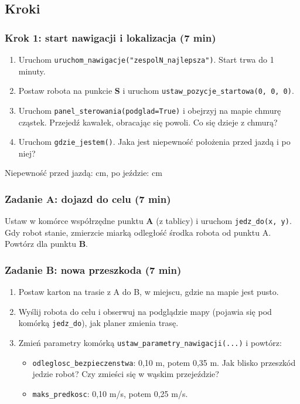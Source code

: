 \subsection{Kroki}\label{kroki}

\subsubsection{Krok 1: start nawigacji i lokalizacja (7 min)}\label{krok-1-start-nawigacji-i-lokalizacja-7-min}

\begin{enumerate}
\def\labelenumi{\arabic{enumi}.}
\tightlist
\item
  Uruchom \texttt{uruchom\_nawigacje("zespolN\_najlepsza")}. Start trwa do 1 minuty.
\item
  Postaw robota na punkcie \textbf{S} i uruchom \texttt{ustaw\_pozycje\_startowa(0,\ 0,\ 0)}.
\item
  Uruchom \texttt{panel\_sterowania(podglad=True)} i obejrzyj na mapie chmurę cząstek. Przejedź kawałek, obracając się powoli. Co się dzieje z chmurą?
\item
  Uruchom \texttt{gdzie\_jestem()}. Jaka jest niepewność położenia przed jazdą i po niej?
\end{enumerate}

Niepewność przed jazdą:  cm, po jeździe:  cm

\subsubsection{Zadanie A: dojazd do celu (7 min)}\label{zadanie-a-dojazd-do-celu-7-min}

Ustaw w komórce współrzędne punktu \textbf{A} (z tablicy) i uruchom \texttt{jedz\_do(x,\ y)}. Gdy robot stanie, zmierzcie miarką odległość środka robota od punktu A. Powtórz dla punktu \textbf{B}.

\subsubsection{Zadanie B: nowa przeszkoda (7 min)}\label{zadanie-b-nowa-przeszkoda-7-min}

\begin{enumerate}
\def\labelenumi{\arabic{enumi}.}
\tightlist
\item
  Postaw karton na trasie z A do B, w miejscu, gdzie na mapie jest pusto.
\item
  Wyślij robota do celu i obserwuj na podglądzie mapy (pojawia się pod komórką \texttt{jedz\_do}), jak planer zmienia trasę.
\item
  Zmień parametry komórką \texttt{ustaw\_parametry\_nawigacji(...)} i powtórz:

  \begin{itemize}
  \tightlist
  \item
    \texttt{odleglosc\_bezpieczenstwa}: 0,10 m, potem 0,35 m. Jak blisko przeszkód jedzie robot? Czy zmieści się w wąskim przejeździe?
  \item
    \texttt{maks\_predkosc}: 0,10 m/s, potem 0,25 m/s.
  \end{itemize}
\end{enumerate}

